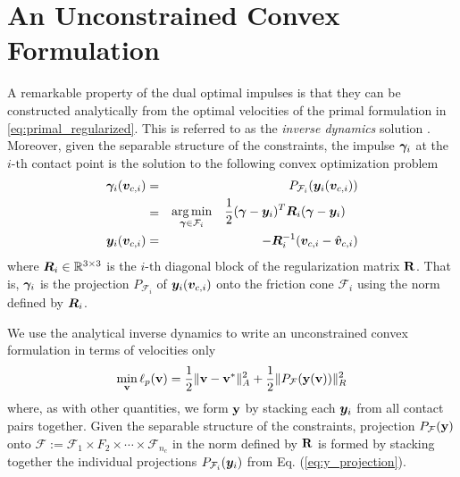 
\section{An Unconstrained Convex Formulation}
\label{sec:unconstrained_convex_formulation}

A remarkable property of the dual optimal impulses is that they
can be constructed analytically from the optimal velocities of the primal
formulation in \eqref{eq:primal_regularized}. This is referred to as the
\textit{inverse dynamics} solution \cite{bib:todorov2014}. Moreover, given the
separable structure of the constraints, the impulse ${\bm\gamma}_i$ at the
$i\text{-th}$ contact point is the solution to the following convex optimization
problem
\begin{eqnarray}
	\bgamma_i(\vf{v}_{c,i})&=& P_{\mathcal{F}_i}(\vf{y}_i(\vf{v}_{c,i}))
	\nonumber\\
	&=&\begin{aligned} \argmin_{\bgamma\in\mathcal{F}_i} \quad &
		\frac{1}{2}(\bgamma-\vf{y}_i)^T\vf{R}_i(\bgamma-\vf{y}_i) \end{aligned}
	\label{eq:y_projection}\\
	\vf{y}_i(\vf{v}_{c,i}) &=& -\vf{R}_i^{-1}(\vf{v}_{c,i}-\hat{\vf{v}}_{c,i})	
\end{eqnarray}
where ${\bm{R}}_i\in\mathbb{R}^{3\times3}$ is the $i\text{-th}$ diagonal block of
the regularization matrix ${\mathbf{R}}$. That is, ${\bm\gamma}_i$ is the projection
$P_{\mathcal{F}_i}$ of ${\bm{y}}_i({\bm{v}}_{c,i})$ onto the friction cone
$\mathcal{F}_i$ using the norm defined by ${\bm{R}}_i$.

We use the analytical inverse dynamics to write an unconstrained convex
formulation in terms of velocities only
\begin{eqnarray}
	\min_{\mf{v}} \ell_p(\mf{v}) = \frac{1}{2}\Vert\mf{v}-\mf{v}^*\Vert_{A}^2 +
	\frac{1}{2}\Vert P_\mathcal{F}(\mf{y}(\mf{v}))\Vert_R^2
	\label{eq:primal_unconstrained}
\end{eqnarray}
where, as with other quantities, we form ${\mathbf{y}}$ by stacking each
${\bm{y}}_i$ from all contact pairs together. Given the separable structure of the
constraints, projection $P_{\mathcal{F}}({\mathbf{y}})$ onto $\mathcal{F} :=
\mathcal{F}_1 \times F_2 \times \cdots \times \mathcal{F}_{n_c}$ in the norm
defined by ${\mathbf{R}}$ is formed by stacking together the individual projections
$P_{\mathcal{F}_i}({\bm{y}}_i)$ from Eq. (\ref{eq:y_projection}).

